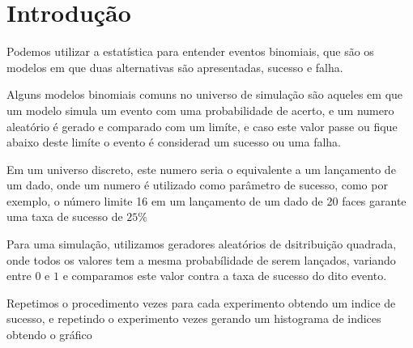 \chapter{Introdu\c{c}\~{a}o}
Podemos utilizar a estat\'{i}stica para entender eventos binomiais, que s\~{a}o os modelos
em que duas alternativas s\~{a}o apresentadas, sucesso e falha.

Alguns modelos binomiais comuns no universo de simula\c{c}\~{a}o
s\~{a}o aqueles em que um modelo simula um evento com uma probabilidade de acerto,
e um numero aleat\'{o}rio \'{e} gerado e comparado com um lim\'{i}te, e caso este valor passe ou
fique abaixo deste lim\'{i}te o evento \'{e} considerad um sucesso ou uma falha.

Em um universo discreto, este numero seria o equivalente a um lan\c{c}amento de um dado,
onde um numero \'{e} utilizado como par\^{a}metro de sucesso, como por exemplo, o número limite 16
em um lan\c{c}amento de um dado de 20 faces garante uma taxa de sucesso de $25\%$

Para uma simula\c{c}\~{a}o, utilizamos geradores aleat\'{o}rios de dsitribui\c{c}\~{a}o quadrada, onde
todos os valores tem a mesma probabílidade de serem lan\c{c}ados, variando entre $0$ e $1$
e comparamos este valor contra a taxa de sucesso do dito evento.

Repetimos o procedimento \introexperimentsize{} vezes para cada experimento obtendo um indice de sucesso,
e repetindo o experimento \introexperimentrepeats{} vezes gerando um histograma de indices obtendo o gr\'{a}fico

